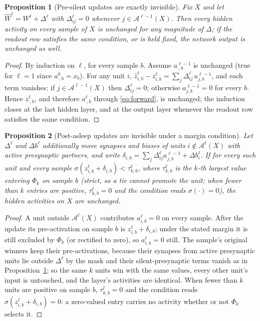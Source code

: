 \documentclass{article}
\newtheorem{proposition}{Proposition}
\begin{document}
\begin{proposition}[Pre-silent updates are exactly invisible]
\label{prop:pre}
Fix $X$ and let $\widehat W^\ell = W^\ell + \Delta^\ell$ with $\Delta^\ell_{ij} = 0$
whenever $j \in \mathcal{A}^{\ell-1}(X)$. Then every hidden activity on every sample of $X$ is
unchanged for any magnitude of $\Delta$; if the readout row satisfies the same condition, or
is held fixed, the network output is unchanged as well.
\end{proposition}
\begin{proof}
By induction on $\ell$, for every sample $b$. Assume $a^{\ell-1}_{\cdot,b}$ is unchanged
(true for $\ell=1$ since $a^0_{\cdot,b}=x_b$). For any unit $i$,
$\widehat z^\ell_{i,b} - z^\ell_{i,b} = \sum_j \Delta^\ell_{ij}\, a^{\ell-1}_{j,b}$, and each
term vanishes: if $j\in\mathcal{A}^{\ell-1}(X)$ then $\Delta^\ell_{ij}=0$; otherwise
$a^{\ell-1}_{j,b}=0$ for every $b$. Hence $z^\ell_{\cdot,b}$, and therefore $a^\ell_{\cdot,b}$
through \eqref{eq:forward}, is unchanged; the induction closes at the last hidden layer, and
at the output layer whenever the readout row satisfies the same condition.
\end{proof}

\begin{proposition}[Post-asleep updates are invisible under a margin condition]
\label{prop:post}
Let $\Delta^\ell$ and $\Delta b^\ell$ additionally move synapses and biases of units
$i\notin\mathcal{A}^\ell(X)$ with active presynaptic partners, and write
$\delta_{i,b} = \sum_j \Delta^\ell_{ij} a^{\ell-1}_{j,b} + \Delta b^\ell_i$. If for every such
unit and every sample $\sigma(z^\ell_{i,b} + \delta_{i,b}) < \tau^\ell_{k,b}$, where
$\tau^\ell_{k,b}$ is the $k$-th largest value entering $\Phi_k$ on sample $b$ (strict, so a tie
cannot promote the unit; when fewer than $k$ entries are positive, $\tau^\ell_{k,b}=0$ and the
condition reads $\sigma(\cdot)=0$), the hidden activities on $X$ are unchanged.
\end{proposition}
\begin{proof}
A unit outside $\mathcal{A}^\ell(X)$ contributes $a^\ell_{i,b}=0$ on every sample. After the
update its pre-activation on sample $b$ is $z^\ell_{i,b}+\delta_{i,b}$; under the stated margin
it is still excluded by $\Phi_k$ (or rectified to zero), so $a^\ell_{i,b}=0$ still. The sample's
original winners keep their pre-activations, because their synapses from active presynaptic
units lie outside $\Delta^\ell$ by the mask and their silent-presynaptic terms vanish as in
Proposition~\ref{prop:pre}; so the same $k$ units win with the same values, every other
unit's input is untouched, and the layer's activities are identical. When fewer than $k$ units
are positive on sample $b$, $\tau^\ell_{k,b}=0$ and the condition reads
$\sigma(z^\ell_{i,b}+\delta_{i,b})=0$: a zero-valued entry carries no activity whether or not
$\Phi_k$ selects it.
\end{proof}
\end{document}
